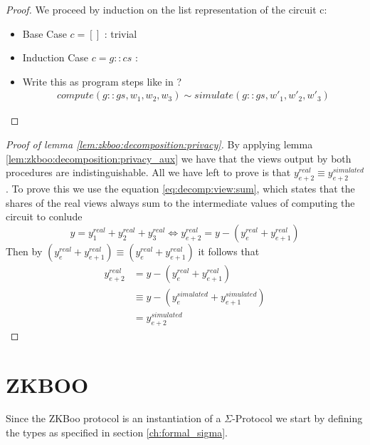 \begin{proof}
  We proceed by induction on the list representation of the circuit c:

  \begin{itemize}
    \item Base Case $c = []$ : trivial
    \item Induction Case $c = g::cs$ :
    \item Write this as program steps like in \cite{certicrypt_sigma}?
      \begin{align*}
        compute(g::gs, w_{1}, w_{2}, w_{3}) \sim simulate(g::gs, w'_{1}, w'_{2}, w'_{3} )
      \end{align*}
  \end{itemize}

\end{proof}

\begin{proof}[Proof of lemma \ref{lem:zkboo:decomposition:privacy}]
  By applying lemma \ref{lem:zkboo:decomposition:privacy_aux} we have that the
  views output by both procedures are indistinguishable. All we have left to prove
  is that $y^{real}_{e+2} \equiv y^{simulated}_{e+2}$. To prove this we use the
  equation \ref{eq:decomp:view:sum}, which states that the shares of the real views always sum to
  the intermediate values of computing the circuit to conlude
  \[
  y = y^{real}_{1} + y^{real}_{2} + y^{real}_{3} \iff y^{real}_{e+2} = y - (y^{real}_{e} + y^{real}_{e+1})
  \]
  Then by
  $(y^{real}_{e} + y^{real}_{e+1}) \equiv (y^{real}_{e} + y^{real}_{e+1})$ it
  follows that
  \begin{align*}
    y^{real}_{e+2} &= y - (y^{real}_{e} + y^{real}_{e+1}) \\
                      &\equiv y - (y^{simulated}_{e} + y^{simulated}_{e+1}) \\
                      &= y^{simulated}_{e+2}
  \end{align*}
\end{proof}


\section{ZKBOO}
\label{sec:formal_zkboo}
Since the ZKBoo protocol is an instantiation of a $\Sigma$-Protocol we start by
defining the types as specified in section \ref{ch:formal_sigma}.



